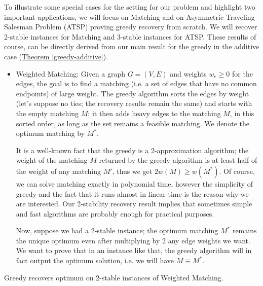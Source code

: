 To illustrate some special cases for the setting for our problem and highlight two important applications, we will focus on Matching and on Asymmetric Traveling Salesman Problem (ATSP) proving greedy recovery from scratch. We will recover 2-stable instances for Matching and 3-stable instances for ATSP. These results of course, can be directly derived from our main result for the greedy in the additive case (\hyperref[greedy-additive]{Theorem \ref{greedy-additive}}).\\
\begin{itemize}
\item Weighted Matching: Given a graph $G=(V,E)$ and weights $w_e\ge 0$ for the edges, the goal is to find a matching (i.e. a set of edges that have no common endpoints) of large
weight. The greedy algorithm sorts the edges by weight (let's suppose no ties; the recovery results remain the same) and starts with the empty matching $M$; it then adds heavy edges to
the matching $M$, in this sorted order, as long as the set remains a feasible matching. We denote the optimum matching by $M^*$.

It is a well-known fact that the greedy is a 2-approximation algorithm; the weight of the matching $M$ returned by the greedy algorithm is at least half
of the weight of any matching $M'$, thus we get $2w(M)\ge w(M^*)$. Of course, we can solve matching exactly in polynomial time, however the simplicity of greedy and the fact that it runs almost in linear time is the reason why we are interested. Our 2-stability recovery result implies that sometimes simple and fast algorithms are probably enough for practical purposes.

Now, suppose we had a 2-stable instance; the optimum matching $M^*$ remains the unique optimum even after multiplying by 2 any edge weights we want. We want to prove that in an instance like that, the greedy algorithm will in fact output the optimum solution, i.e. we will have $M\equiv M^*$.
\end{itemize}
\begin{proposition}
Greedy recovers optimum on 2-stable instances of Weighted Matching.
\end{proposition}
